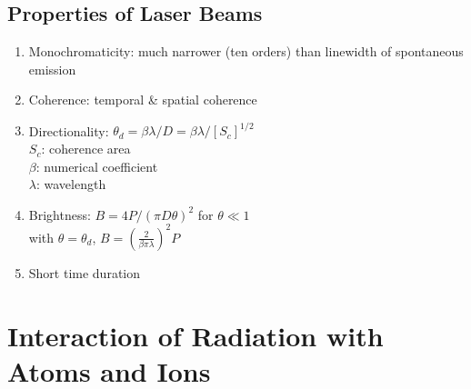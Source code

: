 \documentclass[8pt,a4paper,twocolumn]{article} %
\numberwithin{equation}{section} %
\begin{document}
		\subsection{Properties of Laser Beams} %
		\label{sub:properties_of_laser_beams}
			\begin{enumerate}
				\item Monochromaticity: much narrower (ten orders) than linewidth of spontaneous emission
				\item Coherence: temporal \& spatial coherence
				\item Directionality: $ \theta_d = \beta \lambda/D = \beta \lambda/ [S_c]^{1/2} $\\$S_c$: coherence area\\$\beta$: numerical coefficient\\$\lambda$: wavelength
				\item Brightness: $B = 4P/(\pi D \theta)^2$ for $\theta \ll 1 $\\with $\theta = \theta_d$, $B = \left( \frac{2}{\beta \pi \lambda} \right)^2P $
				\item Short time duration
			\end{enumerate}


	\section{Interaction of Radiation with Atoms and Ions} %
	\label{sec:interaction_of_radiation_with_atoms_and_ions}
		

\end{document}
